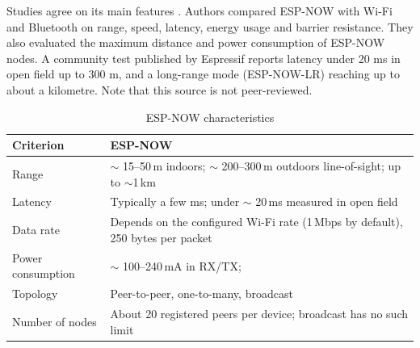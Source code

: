 \noindent Studies agree on its main features \cite{eridani_comparative_2021}. Authors compared ESP-NOW with Wi-Fi and Bluetooth on range, speed, latency, energy usage and barrier resistance. They also evaluated the maximum distance and power consumption of ESP-NOW nodes. A community test \cite{noauthor_esp-now_nodate} published by Espressif reports latency under 20 ms in open field up to 300 m, and a long-range mode (ESP-NOW-LR) reaching up to about a kilometre. Note that this source is not peer-reviewed. 

\begin{table}[H]
\centering
\label{tab:espnow}
\begin{tabular}{@{}p{3.7cm}p{12cm}@{}}
\toprule
\textbf{Criterion} & \textbf{ESP-NOW} \\
\midrule
Range & $\sim$ 15--50\,m indoors; $\sim$ 200--300\,m outdoors line-of-sight; up to $\sim$1\,km  \\
Latency & Typically a few ms; under $\sim$ 20\,ms measured in open field \\
Data rate & Depends on the configured Wi-Fi rate (1\,Mbps by default), 250 bytes per packet \\
Power consumption & $\sim$ 100--240\,mA in RX/TX;\\
Topology & Peer-to-peer, one-to-many, broadcast \\
Number of nodes & About 20 registered peers per device; broadcast has no such limit \\
\bottomrule
\end{tabular}\caption{ESP-NOW characteristics}
\end{table}

\newpage
